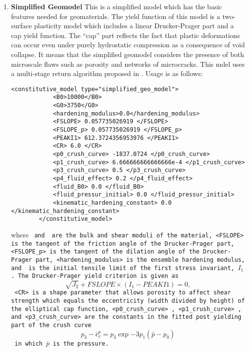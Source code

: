 \begin{enumerate}
\item{\bf Simplified Geomodel} This is a simplified model which has the basic features
needed for geomaterials. The yield function of this model is a two-surface plasticity model 
which includes a linear Drucker-Prager part and a cap yield function. The “cap” part reflects
the fact that plastic deformations can occur even under purely hydrostatic compression as
a consequence of void collapse. It means that the simplified geomodel considers the presence 
of both microscale flaws such as porosity and networks of microcracks. This mdel uses a 
multi-stage return algorithm proposed in \cite{brannon10}. Usage is as follows:
\begin{Verbatim}[fontsize=\footnotesize]
        <constitutive_model type="simplified_geo_model">
            <B0>10000</B0>
            <G0>3750</G0>
            <hardening_modulus>0.0</hardening_modulus>
            <FSLOPE> 0.057735026919 </FSLOPE>
            <FSLOPE_p> 0.057735026919 </FSLOPE_p>
            <PEAKI1> 612.3724356953976 </PEAKI1>
            <CR> 6.0 </CR>
            <p0_crush_curve> -1837.0724 </p0_crush_curve>
            <p1_crush_curve> 6.666666666666666e-4 </p1_crush_curve>
            <p3_crush_curve> 0.5 </p3_crush_curve>
            <p4_fluid_effect> 0.2 </p4_fluid_effect>
            <fluid_B0> 0.0 </fluid_B0>
            <fluid_pressur_initial> 0.0 </fluid_pressur_initial>
            <kinematic_hardening_constant> 0.0 </kinematic_hardening_constant>
        </constitutive_model>
\end{Verbatim}
where \tt <B0> \normalfont and \tt <G0> \normalfont are the bulk and 
shear moduli of the material, \tt <FSLOPE> \normalfont is the tangent of the friction angle 
of the Drucker-Prager part, \tt <FSLOPE\_p> \normalfont is the tangent of the dilation angle 
of the Drucker-Prager part, \tt <hardening\_modulus> \normalfont is the ensemble hardening 
modulus, and \tt <PEAKI1> \normalfont is the initial tensile limit of the 
first stress invariant, $I_1$. The Drucker-Prager yield criterion is given as
\begin{equation}
\sqrt{J_2}+FSLOPE \times (I_1-PEAKI1)=0,
\end{equation}
\tt <CR> \normalfont is a shape parameter that allows porosity to affect shear
strength which equals the eccentricity (width divided by
height) of the elliptical cap function, \tt <p0\_crush\_curve> 
\normalfont, \tt <p1\_crush\_curve> \normalfont, and \tt <p3\_crush\_curve> \normalfont are the
constants in the fitted post yielding part of the crush curve
\begin{equation}
p_3-\bar{\epsilon}_v^p=p_3\exp{-3p_1(\bar{p}-p_0)}
\end{equation}
in which $\bar{p}$ is the pressure.


\end{enumerate}
